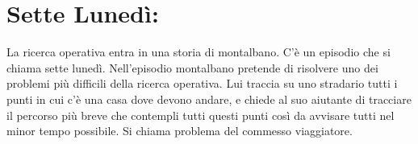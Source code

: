 \documentclass{article}
\begin{document}

\vspace{1cm}


\section{Sette Lunedì:}
La ricerca operativa entra in una storia di montalbano. C'è un episodio che si chiama sette lunedì. Nell'episodio montalbano pretende di risolvere uno dei problemi più difficili della ricerca operativa. Lui traccia su uno stradario tutti i punti in cui c'è una casa dove devono andare, e chiede al suo aiutante di tracciare il percorso più breve che contempli tutti questi punti così da avvisare tutti nel minor tempo possibile. Si chiama problema del commesso viaggiatore. 





\end{document}
